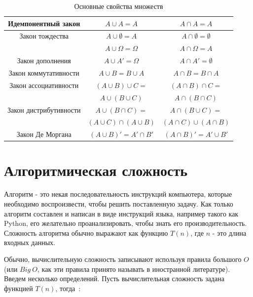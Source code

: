\begin{table}[ht!]
\centering
\small
\begin{tabular}{|c|c|c|}
\hline
Идемпонентный закон       & $A \cup A = A$            & $A \cap A = A$                 \\\hline
Закон тождества           & $A \cup \emptyset = A$    & $A \cap \emptyset = \emptyset$ \\
                          & $A \cup \Omega = \Omega$  & $A \cap \Omega = A$            \\\hline
Закон дополнения          & $A \cup A' = \Omega$ & $A \cap A' = \emptyset$ \\\hline
Закон коммутативности     & $A \cup B = B \cup A$     & $A \cap B = B \cap A$ \\\hline
Закон ассоциативности     & $(A \cup B) \cup C = $ & $(A \cap B) \cap C =$ \\
                          & $A \cup (B \cup C)$    & $A \cap (B \cap C)$ \\\hline
Закон дистрибутивности    & $A \cup (B \cap C) = $ & $A \cap (B \cup C) = $ \\
                          & $(A \cup C) \cap (A \cup B)$ & $(A \cap C) \cup (A \cap B)$ \\\hline
Закон Де Моргана          & $(A \cup B)'= A' \cap B'$ & $(A \cap B)'=A' \cup B'$ \\\hline
\end{tabular}
\caption{Основные свойства множеств}
\label{tab:set:properties}
\end{table}

\section{Алгоритмическая сложность}
\label{sec:complexity}

Алгоритм - это некая последовательность инструкций компьютера, которые необходимо воспроизвести, 
чтобы решить поставленную задачу. Как только алгоритм составлен и написан в виде инструкций языка,
например такого как Python, его желательно проанализировать, чтобы знать его производительность.
Сложность алгоритма обычно выражают как функцию $T(n)$, где $n$ - это длина входных данных. 

Обычно, вычислительную сложность записывают используя правила большого $O$ (или $Big\ O$, как эти правила 
принято называть в иностранной литературе). Введем несколько определений. Пусть вычислительная 
сложность задана функцией $T(n)$, тогда~\cite{weiss:dsaa}:

